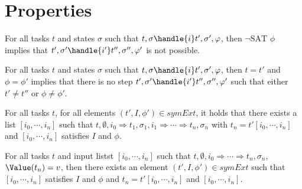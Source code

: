 


\section{Properties}
\label{sec:properties}


\begin{lemma}
For all tasks $t$ and states $\sigma$ such that $t,\sigma \handle{i} t',\sigma',\phi $,
then $\neg\text{SAT }\phi$ implies that $t',\sigma'\handle{i'} t'',\sigma'',\phi'$ is not possible.
\label{lemma:notSat}
\end{lemma}


\begin{lemma}
For all tasks $t$ and states $\sigma$ such that $t,\sigma \handle{i} t',\sigma',\phi$,
then $t=t'$ and $\phi=\phi'$ implies that there is no step $t',\sigma'\handle{i'} t'',\sigma'',\phi'$ such that either $t'\neq t''$ or $\phi\neq\phi'$.
\label{lemma:stuck}
\end{lemma}


\begin{theorem}
\label{thm:sound}

For all tasks $t$, for all elements $(t',I,\phi')\in symEx t$, it holds that there
exists a list $[i_0,\cdots,i_n]$ such that $t,\emptyset,i_0 \Rightarrow t_1,\sigma_1,i_1 \Rightarrow\cdots\Rightarrow t_n,\sigma_n$ with $t_n=t'[i_0,\cdots,i_n]$ and $[i_0,\cdots,i_n]$ satisfies $I$ and $\phi$.
\end{theorem}
\begin{theorem}

For all tasks $t$ and input listst $[i_0,\cdots,i_n]$ such that $t,\emptyset,i_0\Rightarrow\cdots\Rightarrow t_n,\sigma_n$, $\Value(t_n)=v$, then there exists an element $(t',I,\phi')\in symEx t$ such that $[i_0,\cdots,i_n]$ satisfies $I$ and $\phi$ and $t_n=t'[i_0,\cdots,i_n]$ and $[i_0,\cdots,i_n]$.

  \label{thm:complete}
\end{theorem}
